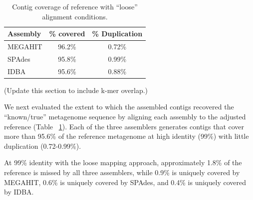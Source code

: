 \documentclass[10pt,a4paper,twocolumn]{article}
\begin{document}
\begin{table}[!h]
\centering
\caption{Contig coverage of reference with ``loose'' alignment conditions.}
\begin{tabular}{|l|c|c|}\hline
\textbf{Assembly} & \textbf{\% covered} & \textbf{\% Duplication}
  \\ \hline
MEGAHIT & 96.2\% & 0.72\% \\ \hline
SPAdes  & 95.8\% & 0.99\% \\ \hline
IDBA    & 95.6\% & 0.88\% \\ \hline
\end{tabular}
\label{table:contig-coverage}
\end{table}

(Update this section to include k-mer overlap.)


We next evaluated the extent to which the assembled contigs recovered the
``known/true'' metagenome sequence by aligning each assembly to the
adjusted reference (Table ~\ref{table:contig-coverage}).  Each of the three
assemblers generates contigs that cover more than 95.6\% of the reference
metagenome at high identity (99\%) with little duplication
(0.72-0.99\%).



At 99\% identity with the loose mapping approach, approximately 1.8\%
of the reference is missed by all three assemblers, while 0.9\% is
uniquely covered by MEGAHIT, 0.6\% is uniquely covered by SPAdes, and
0.4\% is uniquely covered by IDBA.


%
%
\end{document}
